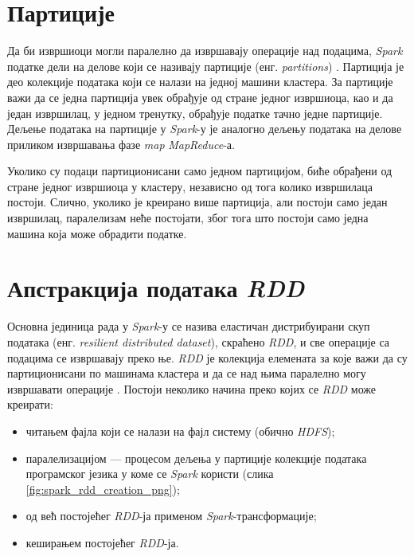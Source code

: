 \documentclass[12pt,oneside]{memoir}
\begin{document}
\section{Партиције}
\label{sec:spark_partic}

Да би извршиоци могли паралелно да извршавају операције над подацима, \textit{Spark} податке дели на делове који се називају партиције (енг. \textit{partitions}) \cite{spark_guide}. Партиција је део колекције података који се налази на једној машини кластера. За партиције важи да се једна партиција увек обрађује од стране једног извршиоца, као и да један извршилац, у једном тренутку, обрађује податке тачно једне партиције. Дељење података на партиције у \textit{Spark}-у је аналогно дељењу података на делове  приликом извршавања фазе \textit{map} \textit{MapReduce}-а.



Уколико су подаци партиционисани само једном партицијом, биће обрађени од стране једног извршиоца у кластеру, независно од тога колико извршилаца постоји. Слично, уколико је креирано више партиција, али постоји само један извршилац, паралелизам неће постојати, због тога што постоји само једна машина која може обрадити податке.

\section{Апстракција података \textit{RDD}}
\label{sec:spark_rdd}

Основна јединица рада у \textit{Spark}-у се назива еластичан дистрибуирани скуп података (енг. \textit{resilient distributed dataset}), скраћено \textit{RDD}, и све операције са подацима се извршавају преко ње. \textit{RDD} је колекција елемената за које важи да су партиционисани по машинама кластера и да се над њима паралелно могу извршавати операције \cite{spark_rdd}. Постоји неколико начина преко којих се \textit{RDD} може креирати:

\begin{itemize}
\item читањем фајла који се налази на фајл систему (обично \textit{HDFS});
\item паралелизацијом --- процесом дељења у партиције колекције података програмског језика у коме се \textit{Spark} користи (слика \ref{fig:spark_rdd_creation_png});
\item од већ постојећег \textit{RDD}-ја применом \textit{Spark}-трансформације;
\item кеширањем постојећег \textit{RDD}-ја.
\end{itemize}
\end{document}
